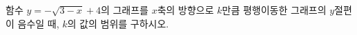 \hspace*{2mm}\begin{minipage}[t]{\dimexpr\linewidth-2mm\relax}\vspace{0pt}
함수 $y=-\sqrt{3-x}+4$의 그래프를 $x$축의 방향으로 $k$만큼 평행이동한 그래프의 $y$절편이 음수일 때, $k$의 값의 범위를 구하시오.\end{minipage}
